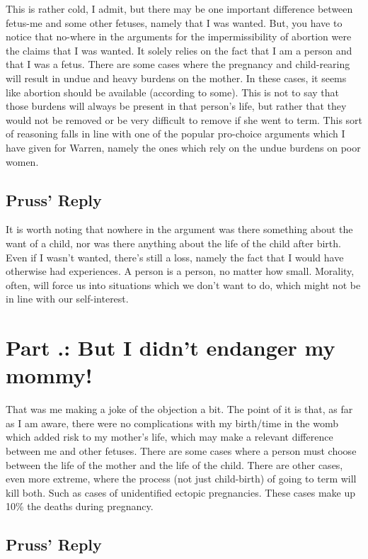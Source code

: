This is rather cold, I admit, but there may be one important difference between fetus-me and some other fetuses, namely that I was wanted. But, you have to notice that no-where in the arguments for the impermissibility of abortion were the claims that I was wanted. It solely relies on the fact that I am a person and that I was a fetus. There are some cases where the pregnancy and child-rearing will result in undue and heavy burdens on the mother. In these cases, it seems like abortion should be available (according to some). This is not to say that those burdens will always be present in that person’s life, but rather that they would not be removed or be very difficult to remove if she went to term. This sort of reasoning falls in line with one of the popular pro-choice arguments which I have given for Warren, namely the ones which rely on the undue burdens on poor women. 
\subsection{Pruss' Reply}

It is worth noting that nowhere in the argument was there something about the want of a child, nor was there anything about the life of the child after birth. Even if I wasn’t wanted, there’s still a loss, namely the fact that I would have otherwise had experiences. A person is a person, no matter how small. Morality, often, will force us into situations which we don't want to do, which might not be in line with our self-interest. 
\section{Part \thechapcount.\theseccount: But I didn't endanger my mommy!}

That was me making a joke of the objection a bit. The point of it is that, as far as I am aware, there were no complications with my birth/time in the womb which added risk to my mother's life, which may make a relevant difference between me and other fetuses. There are some cases where a person must choose between the life of the mother and the life of the child. There are other cases, even more extreme, where the process (not just child-birth) of going to term will kill both. Such as cases of unidentified ectopic pregnancies. These cases make up 10\% the deaths during pregnancy.
\subsection{Pruss' Reply}

